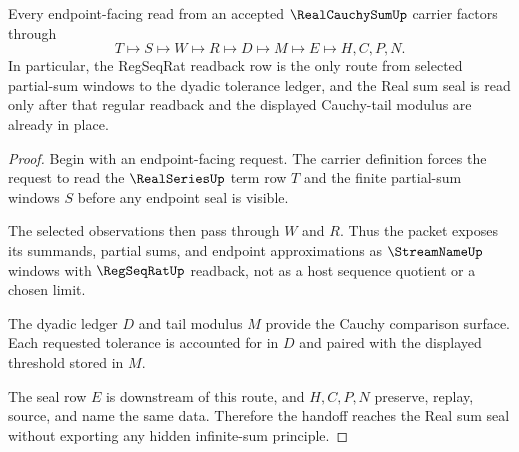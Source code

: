 \begin{theorem}\label{thm:real-cauchy-sum-regseqrat-handoff}
Every endpoint-facing read from an accepted $\RealCauchySumUp$ carrier factors through
$$
T \longmapsto S \longmapsto W \longmapsto R \longmapsto D \longmapsto M \longmapsto E \longmapsto H,C,P,N .
$$
In particular, the RegSeqRat readback row is the only route from selected partial-sum windows to the dyadic tolerance ledger, and the Real sum seal is read only after that regular readback and the displayed Cauchy-tail modulus are already in place.
\end{theorem}
\begin{proof}
Begin with an endpoint-facing request. The carrier definition forces the request to read the $\RealSeriesUp$ term row $T$ and the finite partial-sum windows $S$ before any endpoint seal is visible.

The selected observations then pass through $W$ and $R$. Thus the packet exposes its summands, partial sums, and endpoint approximations as $\StreamNameUp$ windows with $\RegSeqRatUp$ readback, not as a host sequence quotient or a chosen limit.

The dyadic ledger $D$ and tail modulus $M$ provide the Cauchy comparison surface. Each requested tolerance is accounted for in $D$ and paired with the displayed threshold stored in $M$.

The seal row $E$ is downstream of this route, and $H,C,P,N$ preserve, replay, source, and name the same data. Therefore the handoff reaches the Real sum seal without exporting any hidden infinite-sum principle.
\end{proof}

